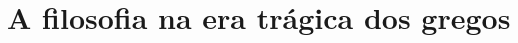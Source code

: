 \documentclass[10pt]{hedrabook}
\begin{document}
\ifodd\thepage\paginabranca\fi

\endgroup
\setcounter{tocdepth}{0}     %
\setcounter{secnumdepth}{-2} %

\hedratoc

\fontsize{10.8pt}{\baselineskip}\selectfont
\baselineskip=12.96pt   %



\part{A filosofia na era trágica dos gregos}




\ifdefined\printcheck\printcheck\fi
\end{document}

